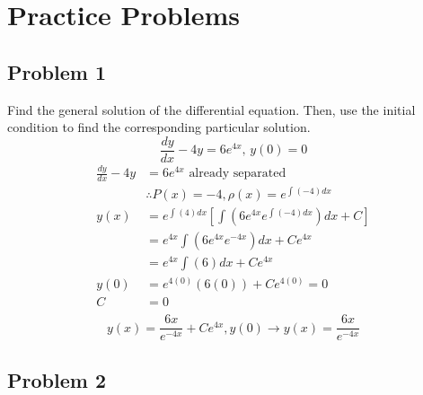 \documentclass{article}
\begin{document}
\newcommand{\hr}{\par\noindent\rule{\textwidth}{0.4pt}}

\tableofcontents
\newpage

\section{Practice Problems}

\subsection{Problem 1}

Find the general solution of the differential equation. Then, use the initial condition to find the corresponding particular solution.
$$ \frac{dy}{dx} - 4y = 6e^{4x} \text{, } y(0) = 0 $$
\begin{align*}
    \frac{dy}{dx} - 4y & = 6e^{4x} \text{ already separated} \\
                       & \therefore P(x) = -4, \rho(x) = e^{\int(-4)dx} \\
    y(x) & = e^{\int(4)dx} \left[ \int \left( 6e^{4x}e^{\int(-4)dx} \right) dx + C \right] \\
         & = e^{4x} \int \left( 6e^{4x}e^{-4x} \right)dx + Ce^{4x} \\
         & = e^{4x} \int (6)dx + Ce^{4x} \\
    y(0) & = e^{4(0)} (6(0)) + Ce^{4(0)} = 0 \\
    C & = 0 \\
\end{align*}
\begin{equation*}
    \boxed{
        y(x) = \frac{6x}{e^{-4x}} + Ce^{4x}, y(0) \rightarrow y(x) = \frac{6x}{e^{-4x}}
    }
\end{equation*}

\subsection{Problem 2}
\end{document}
